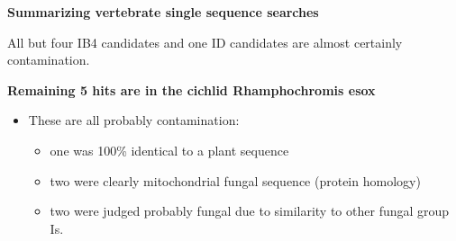 \documentclass[landscape]{slides}
\begin{document}
\begin{slide}
\begin{center}
\textbf{Summarizing vertebrate single sequence searches}
\end{center}


All but four IB4 candidates and one ID candidates are almost certainly
contamination.

\vfill
\end{slide}
\begin{slide}
\begin{center}
\textbf{Remaining 5 hits are in the cichlid Rhamphochromis esox}
\end{center}

\begin{itemize}
\item These are all probably contamination:
\begin{itemize}
\item one was 100\% identical to a plant sequence
\item two were clearly mitochondrial fungal sequence (protein
  homology)
\item two were judged probably fungal due to similarity to other
  fungal group Is.
\end{itemize}
\end{itemize}

\vfill
\end{slide}
\end{document}
